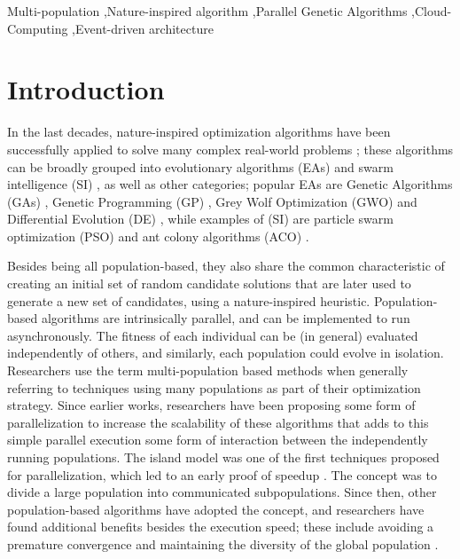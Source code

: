 \documentclass[review]{elsarticle}
\begin{document}
\begin{frontmatter}
\begin{keyword}
Multi-population \sep Nature-inspired algorithm \sep Parallel Genetic Algorithms \sep Cloud-Computing
\sep Event-driven architecture 
\end{keyword}

\end{frontmatter}

\linenumbers

\section{Introduction}

In the last decades, nature-inspired optimization algorithms have been successfully
applied to solve many complex real-world problems
\cite{yang2014nature}; these algorithms can be broadly grouped into evolutionary algorithms (EAs)
\cite{back1996evolutionary} and swarm intelligence (SI)
\cite{kennedy2006swarm}, as well as other categories; popular EAs
are Genetic Algorithms (GAs) \cite{holland1992adaptation,eiben2003genetic}, 
Genetic Programming (GP) \cite{back1996evolutionary}, Grey Wolf Optimization
(GWO) \cite{mirjalili2014grey} and Differential Evolution (DE) \cite{karabouga2004simple},
while examples of (SI) \cite{kennedy2006swarm} are particle swarm
optimization (PSO) \cite{clerc2010particle} and ant colony algorithms (ACO) \cite{dorigo1999ant}.

Besides being all population-based, they also share the common characteristic
of creating an initial set of random candidate solutions that are later used to
generate a new set of candidates, using a nature-inspired heuristic.
Population-based algorithms are intrinsically parallel, and can be implemented to run asynchronously.
The fitness of each individual can be (in general) evaluated independently of 
others, and similarly, each population could evolve in isolation. Researchers use the term
multi-population based methods when generally referring to techniques using
many populations as part of their optimization strategy. 
Since 
earlier works, researchers have been proposing some form of parallelization
\cite{muhlenbein1988evolution} to increase the scalability of these
algorithms that adds to this simple parallel execution some form of
interaction between the independently running populations.
The island model was one of the first techniques proposed for parallelization,
which led to an early proof of speedup   \cite{gorges1990explicit,grosso1985computer}. 
The concept was to divide a large population into communicated subpopulations. 
Since then, other population-based algorithms have adopted the concept, 
and researchers have found additional benefits
besides the execution speed; these include avoiding a premature convergence and
maintaining the diversity of the global population \cite{li2015multi}. 
\end{document}
